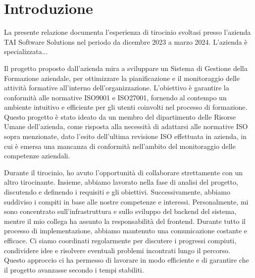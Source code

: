 
\chapter{Introduzione} 

La presente relazione documenta l’esperienza di tirocinio svoltasi presso l’azienda TAI Software Solutions nel periodo da dicembre 2023 a marzo 2024. L’azienda è specializzata...

Il progetto proposto dall'azienda mira a sviluppare un Sistema di Gestione della Formazione aziendale, per ottimizzare la pianificazione e il monitoraggio delle attività formative all'interno dell'organizzazione. L'obiettivo è garantire la conformità alle normative ISO9001 e ISO27001, fornendo al contempo un ambiente intuitivo e efficiente per gli utenti coinvolti nel processo di formazione.
Questo progetto è stato ideato da un membro del dipartimento delle Risorse Umane dell'azienda, come risposta alla necessità di adattarsi alle normative ISO sopra menzionate, dato l'esito dell'ultima revisione ISO effettuata in azienda, in cui è emersa una mancanza di conformità nell'ambito del monitoraggio delle competenze aziendali.

Durante il tirocinio, ho avuto l'opportunità di collaborare strettamente con un altro tirocinante. Insieme, abbiamo lavorato nella fase di analisi del progetto, discutendo e definendo i requisiti e gli obiettivi. Successivamente, abbiamo suddiviso i compiti in base alle nostre competenze e interessi. Personalmente, mi sono concentrato sull'infrastruttura e sullo sviluppo del backend del sistema, mentre il mio collega ha assunto la responsabilità del frontend.
Durante tutto il processo di implementazione, abbiamo mantenuto una comunicazione costante e efficace. Ci siamo coordinati regolarmente per discutere i progressi compiuti, condividere idee e risolvere eventuali problemi incontrati lungo il percorso. Questo approccio ci ha permesso di lavorare in modo efficiente e di garantire che il progetto avanzasse secondo i tempi stabiliti.


